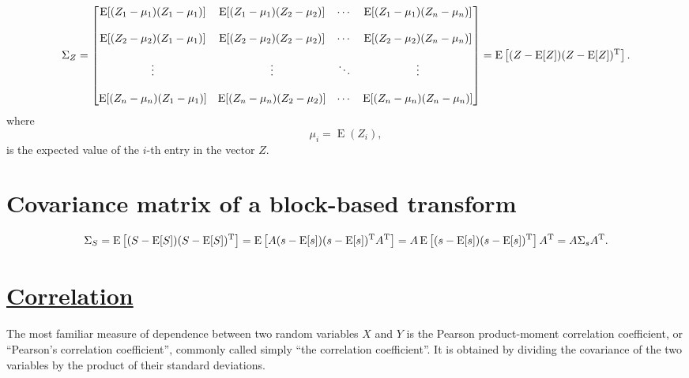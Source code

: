 \begin{equation}
  \Sigma_Z =
    \begin{bmatrix}
       \operatorname{E}[(Z_1 - \mu_1)(Z_1 - \mu_1)] & \operatorname{E}[(Z_1 - \mu_1)(Z_2 - \mu_2)] & \cdots & \operatorname{E}[(Z_1 - \mu_1)(Z_n - \mu_n)] \\ \\
       \operatorname{E}[(Z_2 - \mu_2)(Z_1 - \mu_1)] & \operatorname{E}[(Z_2 - \mu_2)(Z_2 - \mu_2)] & \cdots & \operatorname{E}[(Z_2 - \mu_2)(Z_n - \mu_n)] \\ \\
       \vdots & \vdots & \ddots & \vdots \\ \\
       \operatorname{E}[(Z_n - \mu_n)(Z_1 - \mu_1)] & \operatorname{E}[(Z_n - \mu_n)(Z_2 - \mu_2)] & \cdots & \operatorname{E}[(Z_n - \mu_n)(Z_n - \mu_n)]
    \end{bmatrix} =
    \operatorname{E}
    \left[
       (Z - \operatorname{E}[Z])
       (Z - \operatorname{E}[Z])^{\rm T}
    \right].
\end{equation} where \begin{equation}
  \mu_i = \operatorname{E}(Z_i),
\end{equation} is the expected value of the \(i\)-th entry in the vector
\(Z\).

\section{Covariance matrix of a block-based transform}
\begin{equation}
  \Sigma_S = \operatorname{E} \left[
       (S - \operatorname{E}[S])
       (S - \operatorname{E}[S])^{\rm T}
    \right] = \operatorname{E} \left[
       A(s - \operatorname{E}[s])
       (s - \operatorname{E}[s])^{\rm T}A^{\rm T}
    \right] = 
    A \operatorname{E} \left[
       (s - \operatorname{E}[s])
       (s - \operatorname{E}[s])^{\rm T}
    \right] A^{\rm T} = 
    A\Sigma_sA^{\rm T}.
\end{equation}

\section{\href{https://en.wikipedia.org/wiki/Correlation_and_dependence}{Correlation}}
The most familiar measure of dependence between two random variables
\(X\) and \(Y\) is the Pearson product-moment correlation coefficient,
or ``Pearson's correlation coefficient'', commonly called simply ``the
correlation coefficient''. It is obtained by dividing the covariance of
the two variables by the product of their standard deviations.

